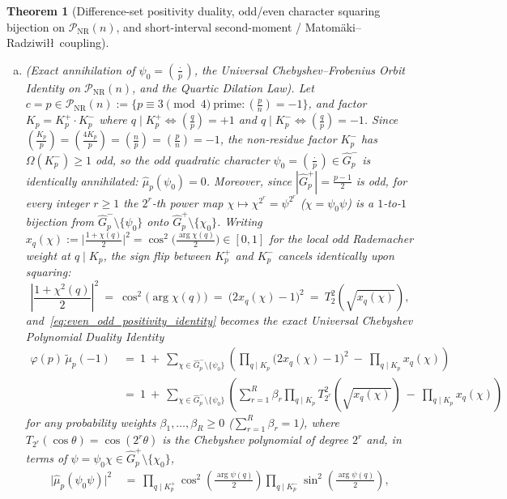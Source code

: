 \documentclass[11pt, a4paper]{article}
\theoremstyle{plain}
\newtheorem{theorem}{Theorem}[section]
\theoremstyle{definition}
\newcommand{\leg}[2]{\left(\frac{#1}{#2}\right)}
\begin{document}
\begin{theorem}[Difference-set positivity duality, odd/even character squaring bijection on $\mathcal{P}_{\mathrm{NR}}(n)$, and short-interval second-moment / Matom\"{a}ki--Radziwi\l\l\ coupling]
\begin{enumerate}[(a)]
    \item \emph{(Exact annihilation of $\psi_0=\leg{\cdot}{p}$, the Universal Chebyshev--Frobenius Orbit Identity on $\mathcal{P}_{\mathrm{NR}}(n)$, and the Quartic Dilation Law).} Let $c=p\in\mathcal{P}_{\mathrm{NR}}(n):=\big\{p\equiv3\pmod 4\ \text{prime}:\leg{p}{n}=-1\big\}$, and factor $K_p=K_p^{+}\cdot K_p^{-}$ where $q\mid K_p^{+}\iff\leg{q}{p}=+1$ and $q\mid K_p^{-}\iff\leg{q}{p}=-1$. Since $\leg{K_p}{p}=\leg{4K_p}{p}=\leg{n}{p}=\leg{p}{n}=-1$, the non-residue factor $K_p^{-}$ has $\Omega(K_p^{-})\ge1$ odd, so the odd quadratic character $\psi_0=\leg{\cdot}{p}\in\widehat{G}_p^{-}$ is \emph{identically annihilated}: $\widehat{\mu}_p(\psi_0)=0$. Moreover, since $|\widehat{G}_p^{+}|=\frac{p-1}{2}$ is odd, for every integer $r\ge1$ the $2^{r}$-th power map $\chi\mapsto\chi^{2^{r}}=\psi^{2^{r}}$ ($\chi=\psi_0\psi$) is a $1$-to-$1$ bijection from $\widehat{G}_p^{-}\setminus\{\psi_0\}$ onto $\widehat{G}_p^{+}\setminus\{\chi_0\}$. Writing $x_q(\chi):=\big|\frac{1+\chi(q)}{2}\big|^{2}=\cos^{2}\big(\frac{\arg\chi(q)}{2}\big)\in[0,1]$ for the local odd Rademacher weight at $q\mid K_p$, the sign flip between $K_p^{+}$ and $K_p^{-}$ cancels identically upon squaring:
    \[
    \left|\frac{1+\chi^{2}(q)}{2}\right|^{2}\ =\ \cos^{2}\big(\arg\chi(q)\big)\ =\ \big(2x_q(\chi)-1\big)^{2}\ =\ T_2^{2}\!\left(\sqrt{x_q(\chi)}\right),
    \]
    and~\eqref{eq:even_odd_positivity_identity} becomes the exact Universal Chebyshev Polynomial Duality Identity
    \begin{align}\label{eq:paired_squaring_identity}
    \varphi(p)\,\widetilde{\mu}_p(-1)\ &=\ 1\ +\ \sum_{\chi\in\widehat{G}_p^{-}\setminus\{\psi_0\}}\left(\prod_{q\mid K_p}\big(2x_q(\chi)-1\big)^{2}\ -\ \prod_{q\mid K_p}x_q(\chi)\right)\nonumber\\
    &=\ 1\ +\ \sum_{\chi\in\widehat{G}_p^{-}\setminus\{\psi_0\}}\left(\sum_{r=1}^{R}\beta_r\prod_{q\mid K_p}T_{2^{r}}^{2}\!\left(\sqrt{x_q(\chi)}\right)\ -\ \prod_{q\mid K_p}x_q(\chi)\right)
    \end{align}
    for any probability weights $\beta_1,\dots,\beta_R\ge0$ ($\sum_{r=1}^{R}\beta_r=1$), where $T_{2^{r}}(\cos\theta)=\cos(2^{r}\theta)$ is the Chebyshev polynomial of degree $2^{r}$ and, in terms of $\psi=\psi_0\chi\in\widehat{G}_p^{+}\setminus\{\chi_0\}$,
    \begin{equation}\label{eq:sin_cos_flip_Kp}
    \begin{split}
    \big|\widehat{\mu}_p(\psi_0\psi)\big|^{2}\ &=\ \prod_{q\mid K_p^{+}}\cos^{2}\!\left(\frac{\arg\psi(q)}{2}\right)\prod_{q\mid K_p^{-}}\sin^{2}\!\left(\frac{\arg\psi(q)}{2}\right),\\

\end{split}
\end{equation}
\end{enumerate}
\end{theorem}
\end{document}
